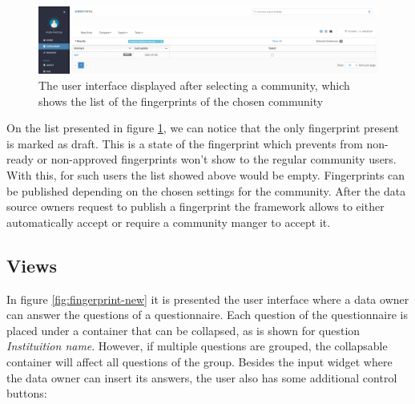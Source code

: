 \begin{figure}
    \center
    \includegraphics[width=\textwidth]{listings}
    \caption{The user interface displayed after selecting a community, which shows the list of the fingerprints of the chosen community}
    \label{fig:listings}
\end{figure}

On the list presented in figure \ref{fig:listings}, we can notice that the only fingerprint present is marked as draft.
This is a state of the fingerprint which prevents from non-ready or non-approved fingerprints won't show to the regular community users.
With this, for such users the list showed above would be empty.
Fingerprints can be published depending on the chosen settings for the community.
After the data source owners request to publish a fingerprint the framework allows to either automatically accept or require a community manger to accept it.

\subsection*{Views}

In figure \ref{fig:fingerprint-new} it is presented the user interface where a data owner can answer the questions of a questionnaire.
Each question of the questionnaire is placed under a container that can be collapsed, as is shown for question \textit{Instituition name}.
However, if multiple questions are grouped, the collapsable container will affect all questions of the group.
Besides the input widget where the data owner can insert its answers, the user also has some additional control buttons:

